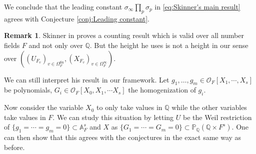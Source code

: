\documentclass[a4paper,11pt,reqno]{amsart}
\newcommand{\Q}{\mathbb{Q}}
\newcommand{\A}{\mathbb{A}}
\newcommand{\Proj}{\mathbb{P}}
\theoremstyle{definition}
\newtheorem{remark}[theorem]{Remark}
\begin{document}
We conclude that the leading constant $\sigma_{\infty} \prod_p \sigma_p$ in \eqref{eq:Skinner's main result} agrees with Conjecture \ref{conj:Leading constant}.

\begin{remark}
	Skinner in \cite{Skinner1997Forms} proves a counting result which is valid over all number fields $F$ and not only over $\Q$. But the height he uses is not a height in our sense over $((U_{F_v})_{v \in \Omega_{F}^{\text{fin}}}, (X_{F_v})_{v \in \Omega_{F}^{\infty}})$.
	
	We can still interpret his result in our framework. Let $g_1, \dots, g_m \in \mathcal{O}_F[X_1, \cdots, X_s]$ be polynomials, $G_i \in \mathcal{O}_F[X_0, X_1, \cdots X_s]$ the homogenization of $g_i$.
	
	Now consider the variable $X_0$ to only take values in $\Q$ while the other variables take values in $F$. We can study this situation by letting $U$ be the Weil restriction of $\{g_1 = \cdots = g_m = 0\} \subset \A^s_F$ and $X$ as $\{G_1 = \cdots = G_m = 0\} \subset \Proj_{\Q}(\Q \times F^s)$. One can then show that this agrees with the conjectures in the exact same way as before.
\end{remark}
\end{document}
